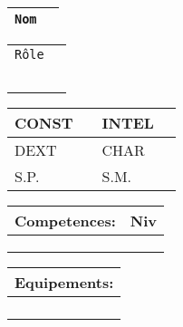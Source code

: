 

\noindent\begin{tabularx}{\columnwidth}{|l|X|}
	\hline
	\cellcolor{black!10} 
	\texttt{Nom}& \\
	\hline
\end{tabularx}

\noindent\begin{tabularx}{\columnwidth}{|l X|}
	\hline
	\cellcolor{black!10} 
	\texttt{Rôle} & \\ 
	& \\
	& \\
	& \\
	& \\
	& \\
	\hline
\end{tabularx}

\noindent\begin{tabularx}{\columnwidth}{|l|X|l|X|}
	\hline
	\cellcolor{black!10} 
	CONST &   &	
	\cellcolor{black!10} 
	INTEL &  \\
	\hline
	\cellcolor{black!10} 
	DEXT &  & 
	\cellcolor{black!10} 	
	CHAR &   \\ 
	\hline
	\cellcolor{black!10} 
	S.P.& &
	\cellcolor{black!10} 
	S.M. &   \\
	\hline
\end{tabularx}

\noindent\begin{tabularx}{\columnwidth}{|X|r|}
	\hline
	\cellcolor{black!10} 
	Competences: & 
	\cellcolor{black!10} 
	Niv\\ \hline
	 & \\ \hline
	 & \\ \hline
	 & \\ \hline
\end{tabularx}

\noindent\begin{tabularx}{\columnwidth}{|X|}
	\hline
	\cellcolor{black!10} 
	Equipements: \\ \hline
	 \\ \hline
	 \\ \hline
	 \\ \hline
	 \\ \hline
\end{tabularx}

